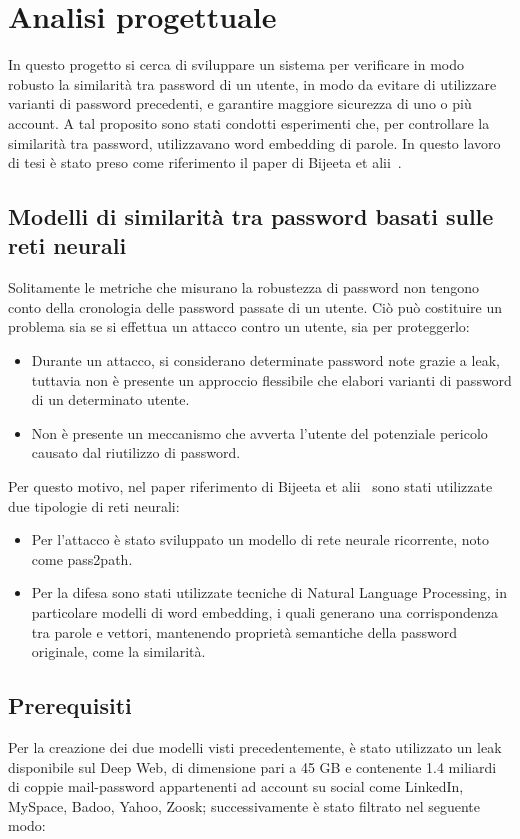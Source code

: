 \chapter{Analisi progettuale}
\label{ch:analisi progettuale}

In questo progetto si cerca di sviluppare un sistema per verificare in modo robusto la similarità tra password di un utente, in modo da evitare di utilizzare varianti di password precedenti, e garantire maggiore sicurezza di uno o più account.
A tal proposito sono stati condotti esperimenti che, per controllare la similarità tra password, utilizzavano word embedding di parole. In questo lavoro di tesi è stato preso come riferimento il paper di Bijeeta  et alii~\cite{bijeeta}.

\section{Modelli di similarità tra password basati sulle reti neurali}
\label{sec:modelli di similarita tra password basati sulle reti neurali}
Solitamente le metriche che misurano la robustezza di password non tengono conto della cronologia delle password passate di un utente.
Ciò può costituire un problema sia se si effettua un attacco contro un utente, sia per proteggerlo:
\begin{itemize}
    \item Durante un attacco, si considerano determinate password note grazie a leak, tuttavia non è presente un approccio flessibile che elabori varianti di password di un determinato utente.
    \item Non è presente un meccanismo che avverta l'utente del potenziale pericolo causato dal riutilizzo di password.
\end{itemize}
Per questo motivo, nel paper riferimento di Bijeeta et alii~\cite{bijeeta} sono stati utilizzate due tipologie di reti neurali:
\begin{itemize}
    \item Per l'attacco è stato sviluppato un modello di rete neurale ricorrente, noto come pass2path.
    \item Per la difesa sono stati utilizzate tecniche di Natural Language Processing, in particolare modelli di word embedding, i quali generano una corrispondenza tra parole e vettori, mantenendo proprietà semantiche della password originale, come la similarità.
\end{itemize}

\section{Prerequisiti}
\label{sec:prerequisiti}
Per la creazione dei due modelli visti precedentemente, è stato utilizzato un leak disponibile sul Deep Web, di dimensione pari a 45 GB e contenente 1.4 miliardi di coppie mail-password appartenenti ad account su social come LinkedIn, MySpace, Badoo, Yahoo, Zoosk; successivamente è stato filtrato nel seguente modo:

